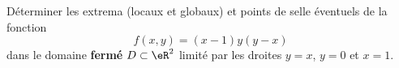 
\begin{exercice}\label{exoOptimSS0006}

 Déterminer les extrema (locaux et globaux) et points de selle éventuels de la fonction 
\begin{equation}
	f(x,y) = (x-1)y(y-x)
\end{equation}
dans le domaine {\bf fermé} $D\subset \eR^2$ limité par les droites $y=x$, $y=0$ et $x=1$. 

\end{exercice}
